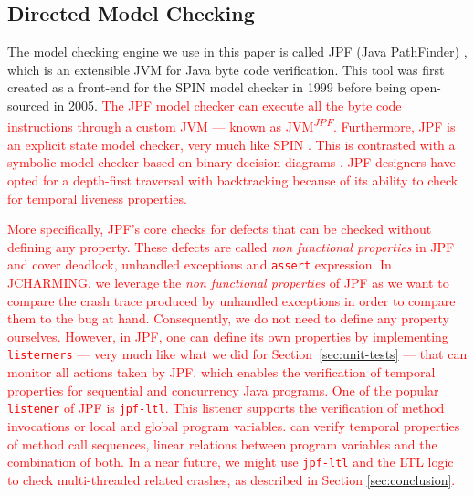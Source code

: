 \documentclass[times, doublespace]{smrauth}
\newcommand{\red}[1]{\textcolor{red}{#1}}
\begin{document}
{\subsection{Directed Model Checking}

The model checking engine we use in this paper is called JPF
(Java PathFinder) \cite{Visser2004}, which is an extensible JVM for Java
byte code verification. This tool was first created as a front-end
for the SPIN model checker \cite{holzmann1997model} in 1999 before being
open-sourced in 2005.
\red{The JPF model checker can execute all the byte code instructions through a custom JVM --- known as JVM\textsuperscript{\textit{JPF}}. Furthermore, JPF is an explicit state model checker,
very much like SPIN \cite{holzmann1997model}. This is contrasted with a symbolic model
checker based on binary decision diagrams \cite{mcmillan1993symbolic}.
JPF designers have opted for a depth-first traversal with backtracking  because of its ability to check for temporal liveness properties.}

\red{More specifically, JPF's core checks for defects that can be checked without defining any property.
These defects are called \textit{non functional properties} in JPF and cover deadlock, unhandled exceptions and \texttt{assert} expression.
In JCHARMING, we leverage the \textit{non functional properties} of JPF as we want to compare the crash trace produced by unhandled exceptions in order to compare them to the bug at hand.
Consequently, we do not need to define any property ourselves.
However, in JPF, one can define its own properties by implementing \texttt{listerners} --- very much like what we did for Section~\ref{sec:unit-tests} --- that can monitor all actions taken by JPF. which enables the verification of temporal properties for sequential and concurrency Java programs.
One of the popular \texttt{listener} of JPF is \texttt{jpf-ltl}.
This listener supports the verification of method invocations or local and global program variables. \textttt{jpf-ltl} can verify temporal properties of method call sequences, linear relations between program variables and the combination of both.
In a near future, we might use \texttt{jpf-ltl} and the LTL logic to check multi-threaded related crashes, as described in Section \ref{sec:conclusion}.}

}
\end{document}
